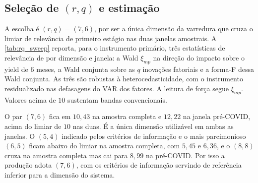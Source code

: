 \documentclass[
article,			%
12pt,				%
oneside,			%
a4paper,			%
hidelinks, 
english,			%
brazil,				%
]{abntex2}
\theoremstyle{plain}
\theoremstyle{definition}
\theoremstyle{remark}
\begin{document}
\subsection{Seleção de $(r, q)$ e estimação}

A escolha é $(r, q) = (7, 6)$, por ser a única dimensão da varredura que cruza o limiar de relevância de primeiro estágio nas duas janelas amostrais. A \autoref{tab:rq_sweep} reporta, para o instrumento primário, três estatísticas de relevância de  por dimensão e janela: a Wald $\xi_{mp}$ na direção do impacto sobre o yield de 6 meses, a Wald conjunta sobre as $q$ inovações fatoriais e a forma-F dessa Wald conjunta. As três são robustas à heterocedasticidade, com o instrumento residualizado nas defasagens do VAR dos fatores. A leitura de força segue $\xi_{mp}$. Valores acima de $10$ sustentam bandas convencionais. 

O par $(7, 6)$ fica em $10{,}43$ na amostra completa e $12{,}22$ na janela pré-COVID, acima do limiar de $10$ nas duas. É a única dimensão utilizável em ambas as janelas. O $(5, 4)$ indicado pelos critérios de informação e o mais parcimonioso $(6, 5)$ ficam abaixo do limiar na amostra completa, com $5{,}45$ e $6{,}36$, e o $(8, 8)$ cruza na amostra completa mas cai para $8{,}99$ na pré-COVID. Por isso a produção adota $(7, 6)$, com os critérios de informação servindo de referência inferior para a dimensão do sistema.
\end{document}
